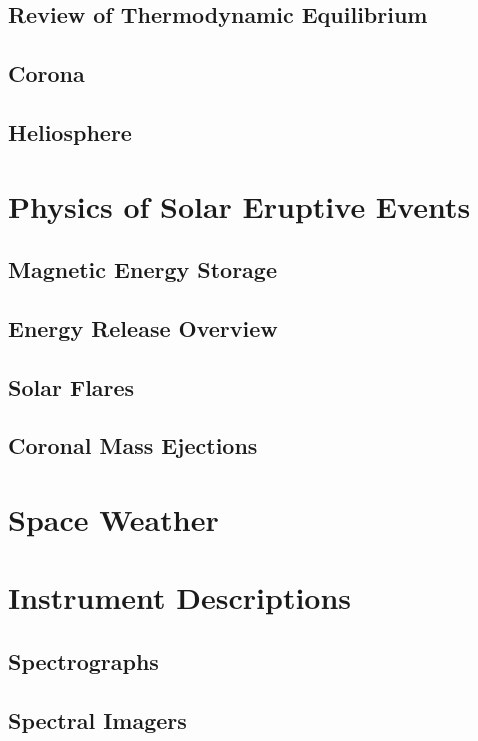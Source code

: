 \subsection{Review of Thermodynamic Equilibrium} 

\subsection{Corona}

\subsection{Heliosphere}

\section{Physics of Solar Eruptive Events}

\subsection{Magnetic Energy Storage}

\subsection{Energy Release Overview}

\subsection{Solar Flares}

\subsection{Coronal Mass Ejections}

\section{Space Weather}

\section{Instrument Descriptions}

\subsection{Spectrographs}

\subsection{Spectral Imagers}

